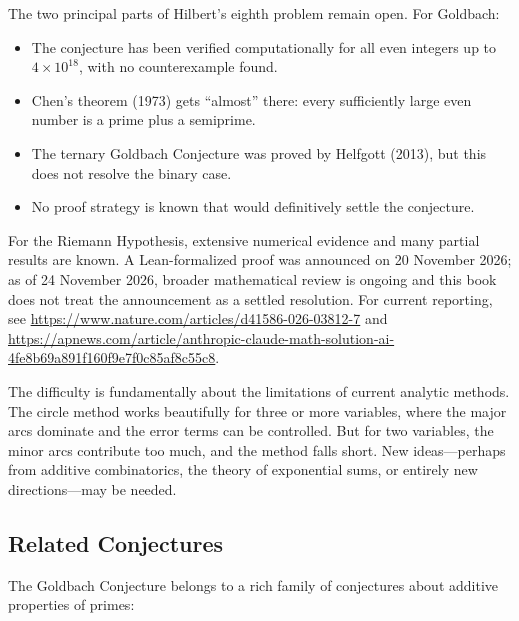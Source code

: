The two principal parts of Hilbert's eighth problem remain open. For Goldbach:

\begin{itemize}
    \item The conjecture has been verified computationally for all even integers up to $4 \times 10^{18}$, with no counterexample found.
    \item Chen's theorem (1973) gets ``almost'' there: every sufficiently large even number is a prime plus a semiprime.
    \item The ternary Goldbach Conjecture was proved by Helfgott (2013), but this does not resolve the binary case.
    \item No proof strategy is known that would definitively settle the conjecture.
\end{itemize}

For the Riemann Hypothesis, extensive numerical evidence and many partial results are known. A Lean-formalized proof was announced on 20 November 2026; as of 24 November 2026, broader mathematical review is ongoing and this book does not treat the announcement as a settled resolution. For current reporting, see \url{https://www.nature.com/articles/d41586-026-03812-7} and \url{https://apnews.com/article/anthropic-claude-math-solution-ai-4fe8b69a891f160f9e7f0c85af8c55c8}.

The difficulty is fundamentally about the limitations of current analytic methods. The circle method works beautifully for three or more variables, where the major arcs dominate and the error terms can be controlled. But for two variables, the minor arcs contribute too much, and the method falls short. New ideas---perhaps from additive combinatorics, the theory of exponential sums, or entirely new directions---may be needed.

\subsection{Related Conjectures}

The Goldbach Conjecture belongs to a rich family of conjectures about additive properties of primes:

